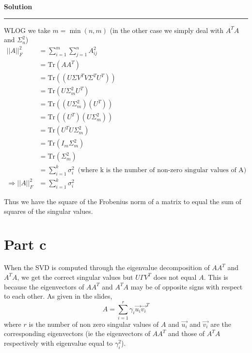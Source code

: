 \documentclass[a4paper,12pt]{article}
\newenvironment{solution}[2][]{%
    \begin{mdframed}[linecolor=blue!70!black, linewidth=2pt, roundcorner=10pt, backgroundcolor=yellow!10!white, skipabove=12pt, skipbelow=12pt]%
        \textbf{\large #2}
        \par\noindent\rule{\textwidth}{0.4pt}
}{
    \end{mdframed}
}
\begin{document}
\begin{solution}{Solution}
      WLOG we take $m = \min(n,m)$ (in the other case we simply deal with $A^{T}A$ and $\Sigma_{n}^{2}$)
      \begin{align*}
          \lvert\lvert A \rvert\rvert_{F}^{2} &= \sum\limits_{i = 1}^{m}\sum\limits_{j = 1}^{n} A_{ij}^{2} \\
                                              &= \text{Tr}(AA^{T}) \\
                                              &= \text{Tr}((U\Sigma V^{T} V \Sigma^{T} U^{T})) \\
                                              &= \text{Tr} (U \Sigma_{m}^{2} U^{T}) \\
                                              &= \text{Tr} ((U \Sigma_{m}^{2}) (U^{T})) \\
                                              &= \text{Tr} ((U^{T})(U \Sigma_{m}^{2})) \\
                                              &= \text{Tr} (U^{T} U \Sigma_{m}^{2}) \\
                                              &= \text{Tr} (I_{m} \Sigma_{m}^{2}) \\
                                              &= \text{Tr} (\Sigma_{m}^{2}) \\
                                              &= \sum\limits_{i = 1}^{k} \sigma_{i}^{2} \,\text{ (where k is the number of non-zero singular values of A)} \\
          \Rightarrow \lvert\lvert A \rvert \rvert_{F}^{2} &= \sum\limits_{i = 1}^{k} \sigma_{i}^{2} 
      \end{align*}

      Thus we have the square of the Frobenius norm of a matrix to equal the sum of squares of the singular values.

      \section*{Part c}
        When the SVD is computed through the eigenvalue decomposition of $AA^{T}$ and $A^{T}A$, we get the correct singular
        values but $U \Gamma V^{T}$ does not equal $A$. This is because the eigenvectors of $AA^{T}$ and $A^{T}A$ may be 
        of opposite signs with respect to each other. As given in the slides, 
        \[ A = \sum\limits_{i = 1}^{r} \gamma_{i} \vec{u_{i}}\vec{v_{i}}^{T}\]
        where $r$ is the number of non zero singular values of $A$ and $\vec{u_{i}}$ and $\vec{v_{i}}$ are the corresponding eigenvectors
        (ie the eigenvectors of $AA^{T}$ and those of $A^{T}A$ respectively with eigenvalue equal to $\gamma_{i}^{2}$).
        

\end{solution}
\end{document}
